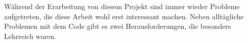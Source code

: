 \documentclass[../main.tex]{subfiles}
\begin{document}
Während der Erarbeitung von diesem Projekt sind immer wieder Probleme aufgetreten, die diese Arbeit wohl erst interessant machen.
Neben alltägliche Problemen mit dem Code gibt es zwei Herausforderungen, die besonders Lehrreich waren.
\end{document}
